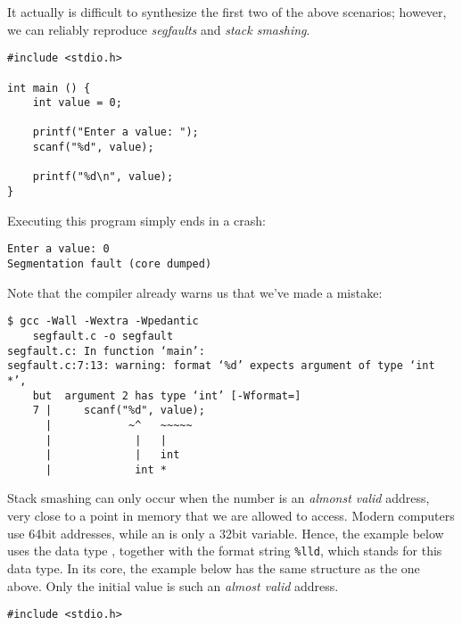 {It actually is difficult to synthesize the first two of the above scenarios; however, we can reliably reproduce \emph{segfaults} and \emph{stack smashing}.

\begin{warnbox}[segfault.c, leftupper=7mm]
\begin{verbatim}
#include <stdio.h>

int main () {
    int value = 0;
    
    printf("Enter a value: "); 
    scanf("%d", value);
    
    printf("%d\n", value);
}
\end{verbatim}
\end{warnbox}

Executing this program simply ends in a crash:
\begin{cmdbox}
\begin{verbatim}
Enter a value: 0
Segmentation fault (core dumped)
\end{verbatim}
\end{cmdbox}

Note that the compiler already warns us that we've made a mistake:
\begin{cmdbox}
\begin{verbatim}
$ gcc -Wall -Wextra -Wpedantic 
    segfault.c -o segfault
segfault.c: In function ‘main’:
segfault.c:7:13: warning: format ‘%d’ expects argument of type ‘int *’,
    but  argument 2 has type ‘int’ [-Wformat=]
    7 |     scanf("%d", value);
      |            ~^   ~~~~~
      |             |   |
      |             |   int
      |             int *
\end{verbatim}
\end{cmdbox}

Stack smashing can only occur when the number is an \emph{almonst valid} address, \ie very close to a point in memory that we are allowed to access. Modern computers use 64bit addresses, while an  is only a 32bit variable. Hence, the example below uses the data type , together with the format string \texttt{\%lld}, which stands for this data type. In its core, the example below has the same structure as the one above. Only the initial value is such an \emph{almost valid} address.

\begin{warnbox}[stackSmashing.c, leftupper=7mm]
\begin{verbatim}
#include <stdio.h>


\end{verbatim}
\end{warnbox}}
